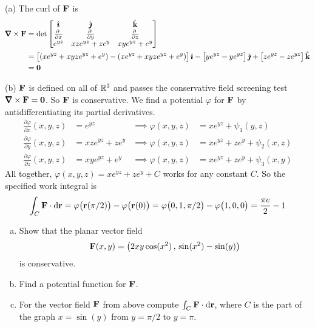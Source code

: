 \begin{solution} (a)
The curl of $\mathbf{F}$ is
\begin{align*}
\vnabla\times\vF
&=\det\left[\begin{matrix}
\hi &\hj &\hk \\
\pdiff{}{x} & \pdiff{}{y} & 
                \pdiff{}{z} \\
e^{yz} & xze^{yz} + ze^y & xye^{yz} + e^y
\end{matrix}
\right] \\
&= \big[(xe^{yz}+xyze^{yz}+e^y)-(xe^{yz}+xyze^{yz}+e^y)\big]\,\hi 
    -\big[ye^{yz}-ye^{yz}\big]\,\hj 
    + \big[ze^{yz}-ze^{yz}\big]\,\hk \\
&= \vZero 
\end{align*}

(b) $\mathbf{F}$ is defined on all of $\mathbb{R}^3$ and passes the conservative
field screening test $\vnabla\times\vF=\vZero$. So $\mathbf{F}$ is
conservative.
We find a potential $\varphi$ for $\mathbf{F}$ by antidifferentiating its partial derivatives.
\begin{align*}
\frac{\partial \varphi}{\partial x}(x,y,z) 
            &= e^{yz} &\implies \varphi(x,y,z)&=xe^{yz}+\psi_1(y,z)\\
\frac{\partial \varphi}{\partial y}(x,y,z) &= xze^{yz} + ze^y&\implies \varphi(x,y,z)&=xe^{yz}+ze^y+\psi_2(x,z) \\
\frac{\partial \varphi}{\partial z}(x,y,z) &= xye^{yz} + e^y&\implies \varphi(x,y,z)&=xe^{yz}+ze^y+\psi_3(x,y)
\end{align*}
All together, $\varphi(x,y,z) = xe^{yz} +ze^y + C$  
works for any constant $C$. So the specified work integral is
\begin{align*}
\int_C\mathbf{F}\cdot\mathrm{d}\mathbf{r}
=\varphi\big(\mathbf{r}(\pi/2)\big) - \varphi\big(\mathbf{r}(0)\big)
=\varphi\big(0,1,\pi/2\big) - \varphi\big(1,0,0\big)
=\frac{\pi e}{2} - 1
\end{align*}
\end{solution}

\begin{question}[M317 2017A] %
\begin{enumerate}[(a)]
\item
Show that the planar vector field
\begin{equation*}
\mathbf{F}(x, y) = \big(2xy \cos(x^2)\,,\, \sin(x^2) - \sin(y)\big)
\end{equation*}
is conservative.

\item
Find a potential function for $\mathbf{F}$.

\item
For the vector field $\mathbf{F}$ from above compute $\int_C\mathbf{F}\cdot\mathrm{d}\mathbf{r}$,
where $C$ is the part of the graph $x = \sin(y)$ from $y = \pi/2$ to 
$y = \pi$.

\end{enumerate}
\end{question}

